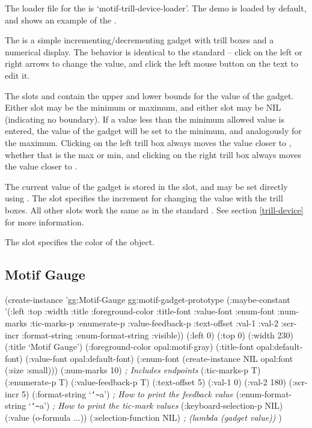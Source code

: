 The loader file for the  is `motif-trill-device-loader'.
The demo  is loaded by default, and shows an example of
the .

The  is a simple incrementing/decrementing gadget with
trill boxes and a numerical display.
The behavior is identical to the standard  -- click on the
left or right arrows to change the value, and click the left mouse button on
the text to edit it.

The slots  and  contain the upper and lower bounds for
the value of the gadget.  Either slot may be the minimum or maximum, and either
slot may be NIL (indicating no boundary).  If a value less than the minimum
allowed value is entered,
the value of the gadget will be set to the minimum, and analogously for the
maximum.  Clicking on the left trill box always moves the value closer to
, whether that is the max or min, and clicking on the right trill
box always moves the value closer to .

The current value of the gadget is stored in the  slot, and may
be set directly using .  The  slot specifies
the increment for changing the value with the trill boxes.
All other slots work the same as in the standard .  See
section \ref{trill-device} for more information.

The  slot specifies the color of the object.


\begin{group}
\section{Motif Gauge}
\label{motif-gauge}

\begin{programexample}
(create-instance 'gg:Motif-Gauge gg:motif-gadget-prototype
   (:maybe-constant '(:left :top :width :title :foreground-color :title-font
		      :value-font :enum-font :num-marks :tic-marks-p
		      :enumerate-p :value-feedback-p :text-offset :val-1 :val-2
		      :scr-incr :format-string :enum-format-string :visible))
   (:left 0)
   (:top 0)
   (:width 230)
   (:title `Motif Gauge')
   (:foreground-color opal:motif-gray)
   (:title-font opal:default-font)
   (:value-font opal:default-font)
   (:enum-font (create-instance NIL opal:font (:size :small)))
   (:num-marks 10)             {\it ; Includes endpoints}
   (:tic-marks-p T)
   (:enumerate-p T)
   (:value-feedback-p T)
   (:text-offset 5)
   (:val-1 0)
   (:val-2 180)
   (:scr-incr 5)
   (:format-string `{\tt\char`\~}a')       {\it ; How to print the feedback value}
   (:enum-format-string `{\tt\char`\~}a')  {\it ; How to print the tic-mark values}
   (:keyboard-selection-p NIL)
   (:value (o-formula ...))
   (:selection-function NIL)   {\it ; (lambda (gadget value))}
   )
\end{programexample}
\end{group}

